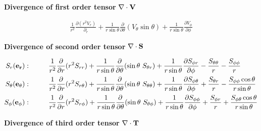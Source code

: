 \documentclass[10pt,paper=a4]{report}
\newcommand{\dr}{\frac{\partial}{\partial r}}
\begin{document}
\newpage

\noindent
{{\bf{Divergence of first order tensor}} $\nabla \cdot {\bf{V}}$}

\begin{align}
\frac{1}{r^2} \frac{\partial (r^2 V_r) }{\partial_r} + \frac{1}{r \sin{\theta}}\frac{\partial}{\partial \theta}(V_\theta \sin{\theta}) + \frac{1}{r \sin{\theta}} \frac{\partial V_\phi}{\partial \phi}
\end{align}

\noindent
{{\bf{Divergence of second order tensor}} $\nabla \cdot {\bf{S}}$}

\begin{align}
S_r ({\bf{e_r}}): & \hspace{1cm} \frac{1}{r^2}\dr (r^2 S_{rr}) + \frac{1}{r\sin{\theta}}\frac{\partial}{\partial \theta} (\sin{\theta} \ S_{\theta r}) + \frac{1}{r\sin{\theta}}\frac{\partial S_{\phi r}}{\partial \phi} - \frac{S_{\theta\theta}}{r} - \frac{S_{\phi\phi}}{r} \\
S_\theta ({\bf{e_\theta}}): & \hspace{1cm} \frac{1}{r^2}\dr (r^2 S_{r \theta}) + \frac{1}{r\sin{\theta}}\frac{\partial}{\partial \theta} (\sin{\theta} \ S_{\theta\theta}) + \frac{1}{r\sin{\theta}}\frac{\partial S_{\phi \theta}}{\partial \phi} + \frac{S_{\theta r}}{r} - \frac{S_{\phi\phi} \cos{\theta}}{r\sin{\theta}} \\
S_\phi ({\bf{e_\phi}}): & \hspace{1cm} \frac{1}{r^2}\dr (r^2 S_{r \phi}) + \frac{1}{r\sin{\theta}}\frac{\partial}{\partial \theta} (\sin{\theta} \ S_{\theta \phi}) + \frac{1}{r\sin{\theta}}\frac{\partial S_{\phi\phi}}{\partial \phi} + \frac{S_{\phi r}}{r} + \frac{S_{\phi \theta} \cos{\theta}}{r\sin{\theta}}
\end{align}

\noindent
{{\bf{Divergence of third order tensor}} $\nabla \cdot {\bf{T}}$}
\end{document}
